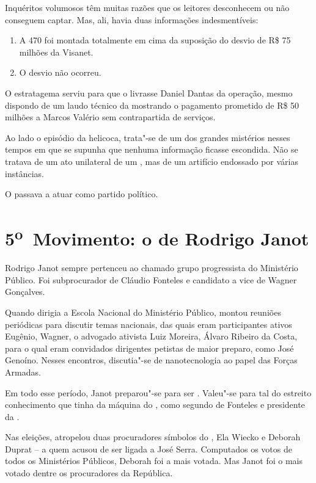 Inquéritos volumosos têm muitas razões que os leitores desconhecem ou
não conseguem captar. Mas, ali, havia duas informações indesmentíveis:

\begin{enumerate}
\itemsep1pt\parskip0pt
\item
  A  470 foi montada totalmente em cima da suposição do desvio de R\$
  75 milhões da Visanet.
\item
  O desvio não ocorreu.
\end{enumerate}

O estratagema serviu para que o  livrasse Daniel Dantas da operação,
mesmo dispondo de um laudo técnico da  mostrando o pagamento prometido
de R\$ 50 milhões a Marcos Valério sem contrapartida de serviços.

Ao lado o episódio da helicoca, trata"-se de um dos grandes mistérios
nesses tempos em que se supunha que nenhuma informação ficasse
escondida. Não se tratava de um ato unilateral de um , mas de um
artifício endossado por várias instâncias.

O  passava a atuar como partido político.

\section{5\textsuperscript{o}~Movimento: o  de Rodrigo Janot}

Rodrigo Janot sempre pertenceu ao chamado grupo progressista do
Ministério Público. Foi subprocurador de Cláudio Fonteles e candidato a
vice de Wagner Gonçalves.

Quando dirigia a Escola Nacional do Ministério Público, montou reuniões
periódicas para discutir temas nacionais, das quais eram participantes
ativos Eugênio, Wagner, o advogado ativista Luiz Moreira, Álvaro Ribeiro
da Costa, para o qual eram convidados dirigentes petistas de maior
preparo, como José Genoíno. Nesses encontros, discutia"-se de
nanotecnologia ao papel das Forças Armadas.

Em todo esse período, Janot preparou"-se para ser . Valeu"-se para tal
do estreito conhecimento que tinha da máquina do , como segundo de
Fonteles e presidente da .

Nas eleições, atropelou duas procuradores símbolos do , Ela Wiecko e
Deborah Duprat -- a quem acusou de ser ligada a José Serra. Computados
os votos de todos os Ministérios Públicos, Deborah foi a mais votada.
Mas Janot foi o mais votado dentre os procuradores da República.

